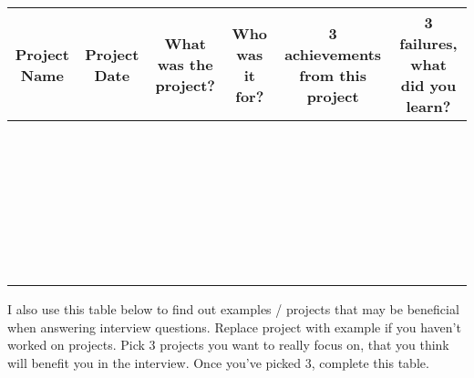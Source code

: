 \documentclass{article}
\begin{document}
\begin{landscape}
 \begin{tabular}{c c c c c c} 
 \hline
 Project Name & Project Date & What was the project? & Who was it for? & 3 achievements from this project & 3 failures, what did you learn?\\ [0.5ex] 
 \hline\hline
  &  &  & & & &  \\ \\\\\\\\\\
 \hline
 &  &  & & & &  \\ \\\\\\\\\\
 \hline
 &  &  & & & &  \\ \\\\\\\\\\
 \hline
 &  &  & & & &  \\\\\\\\\\\\
 \hline
 &  &  & & & &  \\\\\\ \\\\\\[1ex] 
 \hline
\end{tabular}


\end{landscape}
\restoregeometry
\newpage
I also use this table below to find out examples / projects that may be
beneficial when answering interview questions. Replace project with
example if you haven't worked on projects. Pick 3 projects you want to
really focus on, that you think will benefit you in the interview. Once
you've picked 3, complete this table.
\newpage
\end{document}
